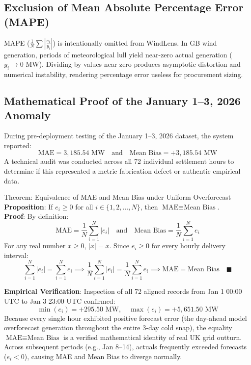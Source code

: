 \documentclass[11pt,a4paper]{article}
\begin{document}
\subsection{Exclusion of Mean Absolute Percentage Error (MAPE)}
MAPE ($\frac{1}{N} \sum \left|\frac{e_i}{y_i}\right|$) is intentionally omitted from WindLens. In GB wind generation, periods of meteorological lull yield near-zero actual generation ($y_i \to 0$ MW). Dividing by values near zero produces asymptotic distortion and numerical instability, rendering percentage error useless for procurement sizing.

\subsection{Mathematical Proof of the January 1--3, 2026 Anomaly}
During pre-deployment testing of the January 1--3, 2026 dataset, the system reported:
\begin{equation}
\text{MAE} = 3,185.54 \text{ MW} \quad \text{and} \quad \text{Mean Bias} = +3,185.54 \text{ MW}
\end{equation}
A technical audit was conducted across all 72 individual settlement hours to determine if this represented a metric fabrication defect or authentic empirical data.

\begin{infobox}{Theorem: Equivalence of MAE and Mean Bias under Uniform Overforecast}
\textbf{Proposition}: If $e_i \ge 0$ for all $i \in \{1, 2, \dots, N\}$, then $\text{MAE} \equiv \text{Mean Bias}$.\\
\textbf{Proof}:
By definition:
\begin{equation}
\text{MAE} = \frac{1}{N} \sum_{i=1}^N |e_i| \quad \text{and} \quad \text{Mean Bias} = \frac{1}{N} \sum_{i=1}^N e_i
\end{equation}
For any real number $x \ge 0$, $|x| = x$. Since $e_i \ge 0$ for every hourly delivery interval:
\begin{equation}
\sum_{i=1}^N |e_i| = \sum_{i=1}^N e_i \implies \frac{1}{N} \sum_{i=1}^N |e_i| = \frac{1}{N} \sum_{i=1}^N e_i \implies \text{MAE} = \text{Mean Bias} \quad \blacksquare
\end{equation}
\end{infobox}
\textbf{Empirical Verification}:
Inspection of all 72 aligned records from Jan 1 00:00 UTC to Jan 3 23:00 UTC confirmed:
\begin{equation}
\min(e_i) = +295.50 \text{ MW}, \quad \max(e_i) = +5,651.50 \text{ MW}
\end{equation}
Because every single hour exhibited positive forecast error (the day-ahead model overforecast generation throughout the entire 3-day cold snap), the equality $\text{MAE} \equiv \text{Mean Bias}$ is a verified mathematical identity of real UK grid outturn. Across subsequent periods (e.g., Jan 8--14), actuals frequently exceeded forecasts ($e_i < 0$), causing MAE and Mean Bias to diverge normally.
\end{document}
